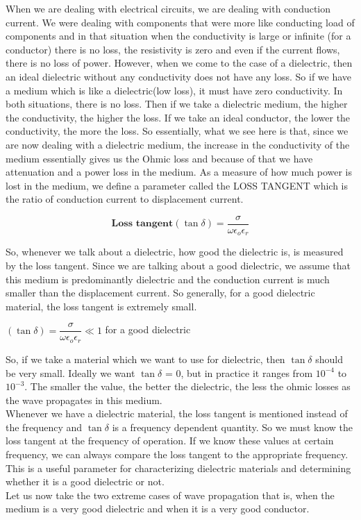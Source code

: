 When we are dealing with electrical circuits, we are dealing with conduction current. We were dealing with components that were more like conducting load of components and in that situation when the conductivity is large or infinite (for a conductor) there is no loss, the resistivity is zero and even if the current flows, there is no loss of power.
However, when we come to the case of a dielectric, then an ideal dielectric without any conductivity does not have any loss. So if we have a medium which is like a dielectric(low loss), it must have zero conductivity. In both situations, there is no loss. Then if we take a dielectric medium, the higher the conductivity, the higher the loss. If we take an ideal conductor, the lower the conductivity, the more the loss. So essentially, what we see here is that, since we are now dealing with a dielectric medium, the increase in the conductivity of the medium essentially gives us the Ohmic loss and because of that we have attenuation and a power loss in the medium.
As a measure of how much power is lost in the medium, we define a parameter called the LOSS TANGENT which is the ratio of conduction current to displacement current.

\begin{equation}
\textbf{Loss tangent}(\tan\delta) = \dfrac{\sigma}{\omega\epsilon_{o}\epsilon_{r}}
\end{equation}

So, whenever we talk about a dielectric, how good the dielectric is, is measured by the loss tangent. Since we are talking about a good dielectric, we assume that this medium is predominantly dielectric and the conduction current is much smaller than the displacement current. So generally, for a good dielectric material, the loss tangent is extremely small. 

\begin{center}
$(\tan\delta) = \dfrac{\sigma}{\omega\epsilon_{o}\epsilon_{r}} \ll 1$ for a good dielectric
\end{center}

So, if we take a material which we want to use for dielectric, then $\tan\delta$ should be very small. Ideally we want $\tan\delta$ = 0, but in practice it ranges from $10^{-4}$ to $10^{-3}$. The smaller the value, the better the dielectric, the less the ohmic losses as the wave propagates in this medium.\\ 
Whenever we have a dielectric material, the loss tangent is mentioned instead of the frequency and $\tan\delta$ is a frequency dependent quantity. So we must know the loss tangent at the frequency of operation. If we know these values at certain frequency, we can always compare the loss tangent to the appropriate frequency. This is a useful parameter for characterizing dielectric materials and determining whether it is a good dielectric or not.\\ 
Let us now take the two extreme cases of wave propagation that is, when the medium is a very good dielectric and when it is a very good conductor.

